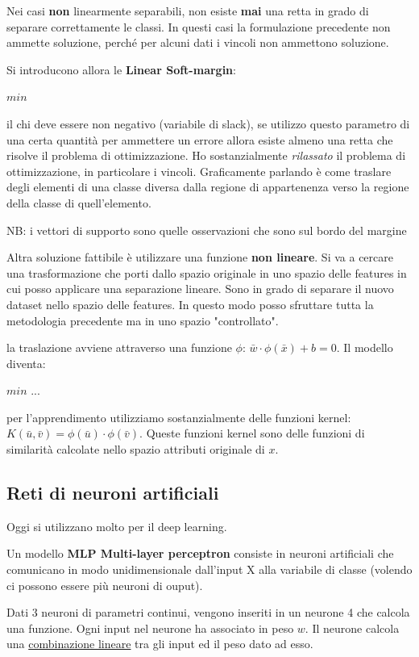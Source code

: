 Nei casi \textbf{non} linearmente separabili, non esiste \textbf{mai} una retta in grado di separare correttamente le classi. In questi casi la formulazione precedente non ammette soluzione, perch\'e per alcuni dati i vincoli non ammettono soluzione. 

Si introducono allora le \textbf{Linear Soft-margin}:

$min $

il chi deve essere non negativo (variabile di slack), se utilizzo questo parametro di una certa quantit\`a per ammettere un errore allora esiste almeno una retta che risolve il problema di ottimizzazione. Ho sostanzialmente \textit{rilassato} il problema di ottimizzazione, in particolare i vincoli. Graficamente parlando \`e come traslare degli elementi di una classe diversa dalla regione di appartenenza verso la regione della classe di quell'elemento.

NB: i vettori di supporto sono quelle osservazioni che sono sul bordo del margine

Altra soluzione fattibile \`e utilizzare una funzione \textbf{non lineare}. Si va a cercare una trasformazione che porti dallo spazio originale in uno spazio delle features in cui posso applicare una separazione lineare. Sono in grado di separare il nuovo dataset nello spazio delle features. In questo modo posso sfruttare tutta la metodologia precedente ma in uno spazio "controllato". 

la traslazione avviene attraverso una funzione $\phi$: $\bar{w} \cdot \phi(\bar{x}) + b = 0$. Il modello diventa:

$ min $ ...

per l'apprendimento utilizziamo sostanzialmente delle funzioni kernel: $K(\bar{u}, \bar{v}) = \phi(\bar{u}) \cdot \phi(\bar{v})$. Queste funzioni kernel sono delle funzioni di similarit\`a calcolate nello spazio attributi originale di $x$.

\subsection{Reti di neuroni artificiali}
Oggi si utilizzano molto per il deep learning.

Un modello \textbf{MLP Multi-layer perceptron} consiste in neuroni artificiali che comunicano in modo unidimensionale dall'input X alla variabile di classe (volendo ci possono essere pi\`u neuroni di ouput).

Dati 3 neuroni di parametri continui, vengono inseriti in un neurone 4 che calcola una funzione. Ogni input nel neurone ha associato in peso $w$.
Il neurone calcola una \underline{combinazione lineare} tra gli input ed il peso dato ad esso. 

